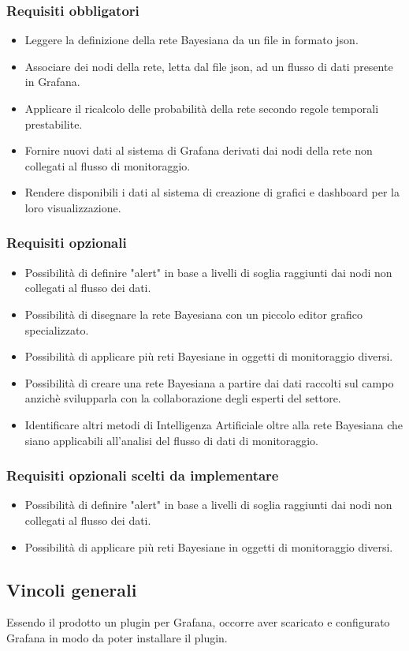 				\subsubsection{Requisiti obbligatori}
				\begin{itemize}
					\item Leggere la definizione della rete Bayesiana da un file in formato json.
					\item Associare dei nodi della rete, letta dal file json, ad un flusso di dati presente in Grafana.
					\item Applicare il ricalcolo delle probabilità della rete secondo regole temporali prestabilite.
					\item Fornire nuovi dati al sistema di Grafana derivati dai nodi della rete non collegati al flusso di monitoraggio.
					\item Rendere disponibili i dati al sistema di creazione di grafici e dashboard per la loro visualizzazione.
		        \end{itemize}
				\subsubsection{Requisiti opzionali}
				\begin{itemize}
					\item Possibilità di definire "alert" in base a livelli di soglia raggiunti dai nodi non collegati al flusso dei dati.
					\item Possibilità di disegnare la rete Bayesiana con un piccolo editor grafico specializzato.
					\item Possibilità di applicare più reti Bayesiane in oggetti di monitoraggio diversi.
					\item Possibilità di creare una rete Bayesiana a partire dai dati raccolti sul campo anzichè svilupparla con la collaborazione degli esperti del settore.
					\item Identificare altri metodi di Intelligenza Artificiale oltre alla rete Bayesiana che siano applicabili all'analisi del flusso di dati di monitoraggio.
		        \end{itemize}
		        \subsubsection{Requisiti opzionali scelti da implementare}
				\begin{itemize}
					\item Possibilità di definire "alert" in base a livelli di soglia raggiunti dai nodi non collegati al flusso dei dati.
					\item Possibilità di applicare più reti Bayesiane in oggetti di monitoraggio diversi.
		        	\end{itemize}
				
				
		\subsection{Vincoli generali}			
Essendo il prodotto un plugin per Grafana, occorre aver scaricato e configurato Grafana in modo da poter installare il plugin.


\newpage
